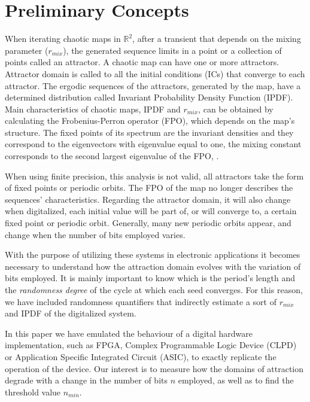 \section{Preliminary Concepts} \label{sec:estudio}
When iterating chaotic maps in $\mathbb{R}^2$, after a transient that depends on the mixing parameter ($r_{mix}$), the generated sequence limits in a point or a collection of points called an attractor. A chaotic map can have one or more attractors. Attractor domain is called to all the initial conditions (ICs) that converge to each attractor. The ergodic sequences of the attractors, generated by the map, have a determined distribution called Invariant Probability Density Function (IPDF). Main characteristics of chaotic maps, IPDF and $r_{mix}$, can be obtained by calculating the Frobenius-Perron operator (FPO), which depends on the map's structure. The fixed points of its spectrum are the invariant densities and they correspond to the eigenvectors with eigenvalue equal to one, the mixing constant corresponds to the second largest eigenvalue of the FPO, \cite{Lasota1994,Lasota1973}.

When using finite precision, this analysis is not valid, all attractors take the form of fixed points or periodic orbits. The FPO of the map no longer describes the sequences' characteristics. Regarding the attractor domain, it will also change when digitalized, each initial value will be part of, or will converge to, a certain fixed point or periodic orbit. Generally, many new periodic orbits appear, and change when the number of bits employed varies.

With the purpose of utilizing these systems in electronic applications it becomes necessary to understand how the attraction domain evolves with the variation of bits employed. It is mainly important to know which is the period's length and the \textsl{randomness degree} of the cycle at which each seed converges. For this reason, we have included randomness quantifiers that indirectly estimate a sort of $r_{mix}$ and IPDF of the digitalized system.

In this paper we have emulated the behaviour of a digital hardware implementation, such as FPGA, Complex Programmable Logic Device (CLPD) or Application Specific Integrated Circuit (ASIC), to exactly replicate the operation of the device. Our interest is
to measure how the domains of attraction degrade with a change in
the number of bits $n$ employed, as well as to find the threshold value 
$n_{min}$. 
